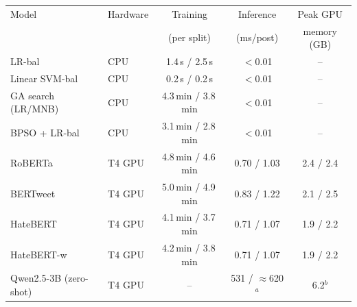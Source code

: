 \begin{tabular}{llccc}
\toprule
Model & Hardware & Training & Inference & Peak GPU \\
 & & (per split) & (ms/post) & memory (GB) \\
\midrule
LR-bal & CPU & 1.4\,s / 2.5\,s & $<$0.01 & -- \\
Linear SVM-bal & CPU & 0.2\,s / 0.2\,s & $<$0.01 & -- \\
GA search (LR/MNB) & CPU & 4.3\,min / 3.8\,min & $<$0.01 & -- \\
BPSO + LR-bal & CPU & 3.1\,min / 2.8\,min & $<$0.01 & -- \\
RoBERTa & T4 GPU & 4.8\,min / 4.6\,min & 0.70 / 1.03 & 2.4 / 2.4 \\
BERTweet & T4 GPU & 5.0\,min / 4.9\,min & 0.83 / 1.22 & 2.1 / 2.5 \\
HateBERT & T4 GPU & 4.1\,min / 3.7\,min & 0.71 / 1.07 & 1.9 / 2.2 \\
HateBERT-w & T4 GPU & 4.2\,min / 3.8\,min & 0.71 / 1.07 & 1.9 / 2.2 \\
Qwen2.5-3B (zero-shot) & T4 GPU & -- & 531 / $\approx$620$^{a}$ & 6.2$^{b}$ \\
\bottomrule
\end{tabular}

